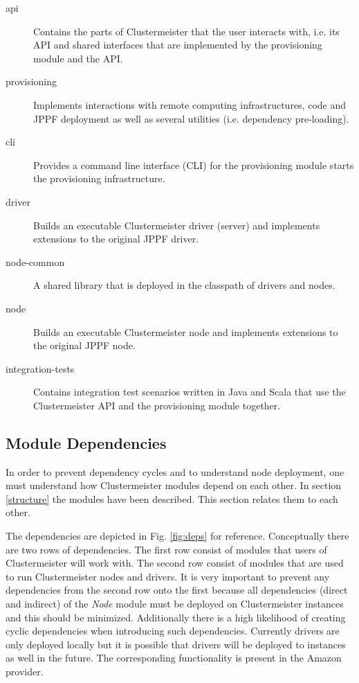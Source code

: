 \documentclass[english]{uzhpub}
\begin{document}
\begin{description}
\item[api] Contains the parts of Clustermeister that the user interacts with, i.e. its API and shared interfaces that are implemented by the provisioning module and the API.
\item[provisioning] Implements interactions with remote computing infrastructures, code and JPPF deployment as well as several utilities (i.e. dependency pre-loading).
\item[cli] Provides a command line interface (CLI) for the provisioning module starts the provisioning infrastructure.
\item[driver] Builds an executable Clustermeister driver (server) and implements extensions to the original JPPF driver.
\item[node-common] A shared library that is deployed in the classpath of drivers and nodes.
\item[node] Builds an executable Clustermeister node and implements extensions to the original JPPF node.
\item[integration-tests] Contains integration test scenarios written in Java and Scala that use the Clustermeister API and the provisioning module together.
\end{description}

\subsection{Module Dependencies}
In order to prevent dependency cycles and to understand node deployment, one must understand how Clustermeister modules depend on each other. In section \ref{structure} the modules have been described. This section relates them to each other.

The dependencies are depicted in Fig. \ref{fig:deps} for reference. Conceptually there are two rows of dependencies. The first row consist of modules that users of Clustermeister will work with. The second row consist of modules that are used to run Clustermeister nodes and drivers. It is very important to prevent any dependencies from the second row onto the first because all dependencies (direct and indirect) of the \textit{Node} module must be deployed on Clustermeister instances and this should be minimized. Additionally there is a high likelihood of creating cyclic dependencies when introducing such dependencies. Currently drivers are only deployed locally but it is possible that drivers will be deployed to instances as well in the future. The corresponding functionality is present in the Amazon provider. 
\end{document}
